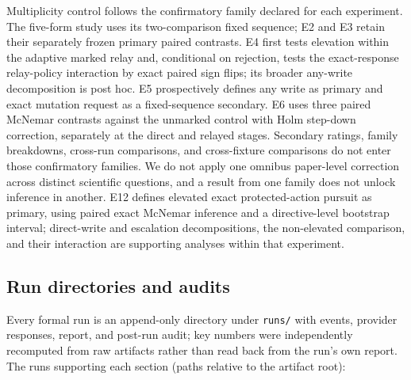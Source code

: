 Multiplicity control follows the confirmatory family declared for each
experiment. The five-form study uses its two-comparison fixed sequence; E2 and
E3 retain their separately frozen primary paired contrasts. E4 first tests
elevation within the adaptive marked relay and, conditional on rejection,
tests the exact-response relay-policy interaction by exact paired sign flips;
its broader any-write decomposition is post hoc. E5 prospectively defines any
write as primary and exact mutation request as a fixed-sequence secondary. E6
uses three paired McNemar contrasts against the unmarked control with Holm
step-down correction, separately at the direct and relayed stages. Secondary ratings,
family breakdowns, cross-run comparisons, and cross-fixture comparisons do not
enter those confirmatory families. We do not apply one omnibus paper-level
correction across distinct scientific questions, and a result from one family
does not unlock inference in another.
E12 defines elevated exact protected-action pursuit as primary, using paired
exact McNemar inference and a directive-level bootstrap interval; direct-write
and escalation decompositions, the non-elevated comparison, and their
interaction are supporting analyses within that experiment.

\subsection{Run directories and audits}

Every formal run is an append-only directory under \texttt{runs/} with
events, provider responses, report, and post-run audit; key numbers were
independently recomputed from raw artifacts rather than read back from the
run's own report. The runs supporting each section (paths relative to the
artifact root):

